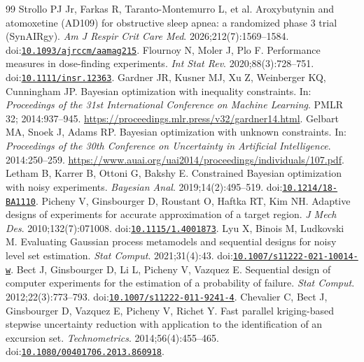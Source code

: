 \documentclass[11pt]{article}
\begin{document}
\begin{thebibliography}{99}
 Strollo PJ Jr, Farkas R, Taranto-Montemurro L, et al. Aroxybutynin and atomoxetine (AD109) for obstructive sleep apnea: a randomized phase 3 trial (SynAIRgy). \textit{Am J Respir Crit Care Med}. 2026;212(7):1569--1584. doi:\href{https://doi.org/10.1093/ajrccm/aamag215}{\nolinkurl{10.1093/ajrccm/aamag215}}.
 Flournoy N, Moler J, Plo F. Performance measures in dose-finding experiments. \textit{Int Stat Rev}. 2020;88(3):728--751. doi:\href{https://doi.org/10.1111/insr.12363}{\nolinkurl{10.1111/insr.12363}}.
 Gardner JR, Kusner MJ, Xu Z, Weinberger KQ, Cunningham JP. Bayesian optimization with inequality constraints. In: \textit{Proceedings of the 31st International Conference on Machine Learning}. PMLR 32; 2014:937--945. \url{https://proceedings.mlr.press/v32/gardner14.html}.
 Gelbart MA, Snoek J, Adams RP. Bayesian optimization with unknown constraints. In: \textit{Proceedings of the 30th Conference on Uncertainty in Artificial Intelligence}. 2014:250--259. \url{https://www.auai.org/uai2014/proceedings/individuals/107.pdf}.
 Letham B, Karrer B, Ottoni G, Bakshy E. Constrained Bayesian optimization with noisy experiments. \textit{Bayesian Anal}. 2019;14(2):495--519. doi:\href{https://doi.org/10.1214/18-BA1110}{\nolinkurl{10.1214/18-BA1110}}.
 Picheny V, Ginsbourger D, Roustant O, Haftka RT, Kim NH. Adaptive designs of experiments for accurate approximation of a target region. \textit{J Mech Des}. 2010;132(7):071008. doi:\href{https://doi.org/10.1115/1.4001873}{\nolinkurl{10.1115/1.4001873}}.
 Lyu X, Binois M, Ludkovski M. Evaluating Gaussian process metamodels and sequential designs for noisy level set estimation. \textit{Stat Comput}. 2021;31(4):43. doi:\href{https://doi.org/10.1007/s11222-021-10014-w}{\nolinkurl{10.1007/s11222-021-10014-w}}.
 Bect J, Ginsbourger D, Li L, Picheny V, Vazquez E. Sequential design of computer experiments for the estimation of a probability of failure. \textit{Stat Comput}. 2012;22(3):773--793. doi:\href{https://doi.org/10.1007/s11222-011-9241-4}{\nolinkurl{10.1007/s11222-011-9241-4}}.
 Chevalier C, Bect J, Ginsbourger D, Vazquez E, Picheny V, Richet Y. Fast parallel kriging-based stepwise uncertainty reduction with application to the identification of an excursion set. \textit{Technometrics}. 2014;56(4):455--465. doi:\href{https://doi.org/10.1080/00401706.2013.860918}{\nolinkurl{10.1080/00401706.2013.860918}}.

\end{thebibliography}
\end{document}

